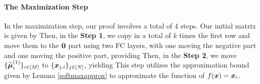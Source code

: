 \paragraph{The Maximization Step} In the maximization step, our proof involves a total of 4 steps. Our initial matrix is given by 
Then, in the \textbf{Step 1}, we copy in a total of $k$ times the first row and move them to the $\boldsymbol{0}$ part using two FC layers, with one moving the negative part and one moving the positive part, providing
Then, in the \textbf{Step 2}, we move $\{\widehat{\boldsymbol{\mu}}_i^{(1)}\}_{i\in[M]}$ to $\{\boldsymbol{x}_{j,i}\}_{j\in[N]}$, yielding
    This step utilizes the approximation bound given by Lemma \ref{softmaxapprox} to approximate the function of $f(\boldsymbol{x})=\boldsymbol{x}_i$.
    
